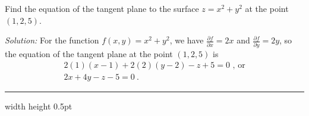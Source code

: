 \newpage
\begin{exmp}
 Find the equation of the tangent plane to the surface $z =  x^2 + y^2$ at the point $(1,2,5)$.\vspace{1mm}
 \par\noindent \emph{Solution:} For the function $f(x,y) = x^2 + y^2$, we have
 $\tfrac{\partial f}{\partial x} = 2x$ and $\tfrac{\partial f}{\partial y} = 2y$, so the equation of the tangent plane
 at the point $(1,2,5)$ is
 \begin{gather*}
  2(1)(x-1)+2(2)(y-2)-z+5=0 \text{~,~or}\\
  2x+4y-z-5=0 ~.
 \end{gather*}
\end{exmp}\vspace{-3mm}
\hrule width \textwidth height 0.5pt
\vspace{3mm}

